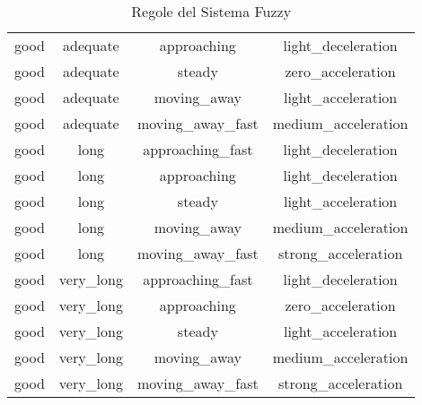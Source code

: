 \begin{table}[!htbp]
\begin{tabular}{|c|c|c|c|}
            good      & adequate    & approaching          & light\_deceleration \\
            good      & adequate    & steady               & zero\_acceleration \\
            good      & adequate    & moving\_away         & light\_acceleration \\
            good      & adequate    & moving\_away\_fast   & medium\_acceleration \\
            good      & long        & approaching\_fast     & light\_deceleration \\
            good      & long        & approaching          & light\_deceleration \\
            good      & long        & steady               & light\_acceleration \\
            good      & long        & moving\_away         & medium\_acceleration \\
            good      & long        & moving\_away\_fast   & strong\_acceleration \\
            good      & very\_long  & approaching\_fast     & light\_deceleration \\
            good      & very\_long  & approaching          & zero\_acceleration \\
            good      & very\_long  & steady               & light\_acceleration \\
            good      & very\_long  & moving\_away         & medium\_acceleration \\
            good      & very\_long  & moving\_away\_fast   & strong\_acceleration \\
            \hline
    \end{tabular}
    \caption{Regole del Sistema Fuzzy}
    \label{tab:regole_fuzzy}
\end{table}


